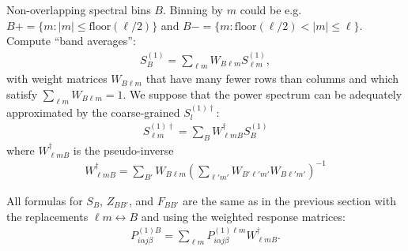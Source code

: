 \documentclass[prd,aps,10pt,nofootinbib,twocolumn,superscriptaddress,preprintnumbers,balancelastpage,longbibliography]{revtex4-1}
\begin{document}
Non-overlapping spectral bins $B$. Binning by $m$ could be e.g.~$B+ = \lbrace m : |m|\le\text{floor}(\ell/2)\rbrace$ and $B- = \lbrace m : \text{floor}(\ell/2) < |m|\le \ell \rbrace$.  Compute ``band averages'':
\begin{align}
S^{(1)}_B = \sum_{\ell m} W_{B \ell m} S^{(1)}_{\ell m},
\end{align}
with weight matrices $W_{B \ell m}$ that have many fewer rows than columns and which satisfy $\sum_{\ell m} W_{B \ell m} = 1$. We suppose that the power spectrum can be adequately approximated by the coarse-grained $S_l^{(1)\dagger}$:
\begin{align}
S^{(1)\dagger}_{\ell m} = \sum_B W_{\ell m B}^\dagger S_B^{(1)}
\end{align}
where $W_{\ell m B}^\dagger$ is the pseudo-inverse
\begin{align}
W_{\ell m B}^\dagger = \sum_{B'} W_{B \ell m} \left( \sum_{\ell' m'} W_{B' \ell' m'} W_{B \ell' m'} \right)^{-1}
\end{align}

All formulas for $S_B$, $Z_{B B'}$, and $F_{BB'}$ are the same as in the previous section with the replacements $\ell m \leftrightarrow B$ and using the weighted response matrices:
\begin{align}
P^{(1)B}_{i\alpha j \beta} = \sum_{\ell m} P^{(1)\ell m}_{i\alpha j \beta} W^\dagger_{\ell m B}.
\end{align}

% 

% 


\end{document}
